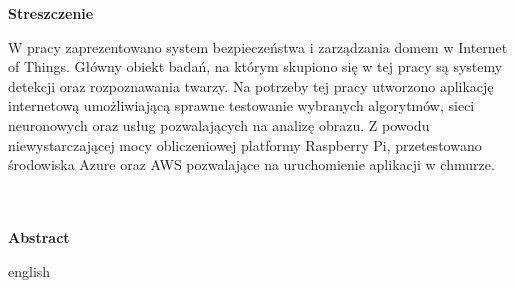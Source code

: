 \vspace*{\fill}
\begin{center}
{\centering \Huge \bfseries Streszczenie}\\
\end{center}
W pracy zaprezentowano system bezpieczeństwa i zarządzania domem w Internet of Things. Główny obiekt badań, na którym skupiono się w tej pracy są systemy detekcji oraz rozpoznawania twarzy. Na potrzeby tej pracy utworzono aplikację internetową umożliwiającą sprawne testowanie wybranych algorytmów, sieci neuronowych oraz usług pozwalających na analizę obrazu. Z powodu niewystarczającej mocy obliczeniowej platformy Raspberry Pi, przetestowano środowiska Azure oraz AWS pozwalające na uruchomienie aplikacji w chmurze.
\\
\\
\\
\begin{center}
 {\Huge \bfseries  Abstract}\\
\end{center}
english
\\
\\
\\
\\
\\
\\
\\
\\
\\
\vspace*{\fill}